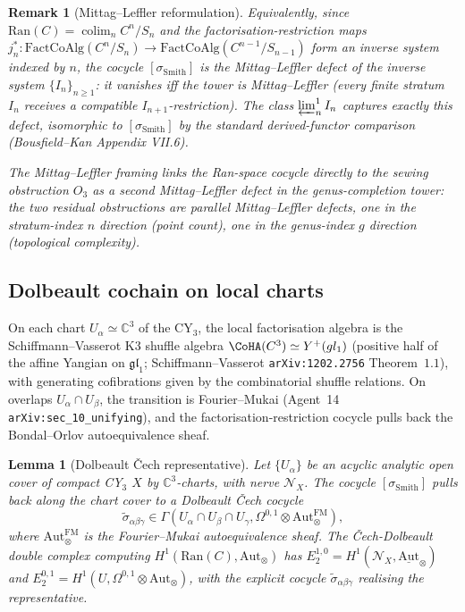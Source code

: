 \documentclass[11pt]{amsart}
\newtheorem{lemma}[theorem]{Lemma}
\newtheorem{remark}[theorem]{Remark}
\newcommand{\cN}{\mathcal{N}}
\newcommand{\Ran}{\mathrm{Ran}}
\newcommand{\FactCoAlg}{\mathrm{FactCoAlg}}
\newcommand{\bC}{\mathbb{C}}
\newcommand{\Aut}{\mathrm{Aut}}
\DeclareMathOperator{\colim}{colim}
\begin{document}
\begin{remark}[Mittag--Leffler reformulation]
\label{rem:O1-mittag-leffler}
Equivalently, since $\Ran(C) = \colim_n C^n/S_n$ and the
factorisation-restriction maps $j^*_n : \FactCoAlg(C^n/S_n) \to
\FactCoAlg(C^{n-1}/S_{n-1})$ form an inverse system indexed by $n$,
the cocycle $[\sigma_{\mathrm{Smith}}]$ is the Mittag--Leffler defect
of the inverse system $\{I_n\}_{n \geq 1}$: it vanishes iff the tower
is Mittag--Leffler (every finite stratum $I_n$ receives a
compatible $I_{n+1}$-restriction). The class
$\varprojlim^1_n I_n$ captures exactly this defect, isomorphic to
$[\sigma_{\mathrm{Smith}}]$ by the standard derived-functor
comparison (Bousfield--Kan Appendix VII.6).

The Mittag--Leffler framing links the Ran-space cocycle directly to
the sewing obstruction $O_3$ as a second Mittag--Leffler defect in
the genus-completion tower: the two residual obstructions are
\emph{parallel} Mittag--Leffler defects, one in the stratum-index $n$
direction (point count), one in the genus-index $g$ direction
(topological complexity).
\end{remark}

\subsection{Dolbeault cochain on local charts}

On each chart $U_\alpha \simeq \bC^3$ of the CY$_3$, the local
factorisation algebra is the Schiffmann--Vasserot K3 shuffle algebra
$\CoHA(\bC^3) \simeq Y^+(\widehat{\mathfrak{gl}}_1)$ (positive half of
the affine Yangian on $\mathfrak{gl}_1$; Schiffmann--Vasserot
\texttt{arXiv:1202.2756} Theorem~$1.1$), with generating cofibrations
given by the combinatorial shuffle relations. On overlaps
$U_\alpha \cap U_\beta$, the transition is Fourier--Mukai (Agent~14
\texttt{arXiv:sec\_10\_unifying}), and the factorisation-restriction
cocycle pulls back the Bondal--Orlov autoequivalence sheaf.

\begin{lemma}[Dolbeault \v{C}ech representative]
\label{lem:dolbeault-cech-O1}
Let $\{U_\alpha\}$ be an acyclic analytic open cover of compact CY$_3$
$X$ by $\bC^3$-charts, with nerve $\cN_X$. The cocycle
$[\sigma_{\mathrm{Smith}}]$ pulls back along the chart cover to a
Dolbeault \v{C}ech cocycle
\[
\tilde\sigma_{\alpha\beta\gamma} \in
\Gamma(U_\alpha \cap U_\beta \cap U_\gamma, \Omega^{0,1}
\otimes \Aut_\otimes^{\mathrm{FM}}),
\]
where $\Aut_\otimes^{\mathrm{FM}}$ is the Fourier--Mukai autoequivalence
sheaf. The \v{C}ech-Dolbeault double complex computing
$H^1(\Ran(C), \Aut_\otimes)$ has $E_2^{1, 0} = H^1(\cN_X,
\underline{\Aut}_\otimes)$ and $E_2^{0, 1} = H^1(U, \Omega^{0,1}
\otimes \Aut_\otimes)$, with the explicit cocycle
$\tilde\sigma_{\alpha\beta\gamma}$ realising the representative.
\end{lemma}
\end{document}

